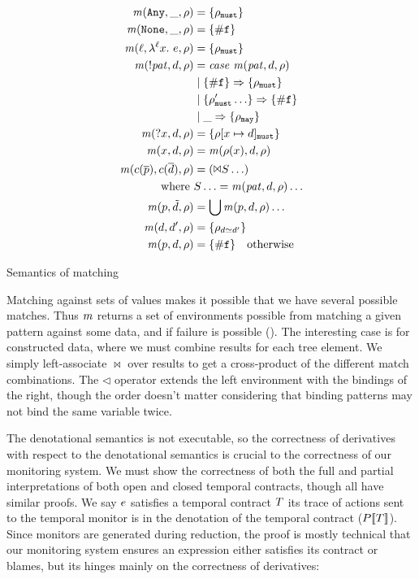   {\begin{align*}
    \matches(\sany, \_, \menv) &= \setof{\menv_\must} \\
    \matches(\snone, \_, \menv) &= \setof{\nomatch} \\
    \matches(\mtoplevelname, \snlam{\mtoplevelname}{\mvar}{\mexp}, \menv) &= \setof{\menv_\must} \\
    \matches(\snegpat{\mvpat}, \mdata, \menv) &= \mathit{case}\ \matches(\mvpat, \mdata, \menv)\\
      &\alt \setof{\nomatch} \Rightarrow \setof{\menv_\must} \\
      &\alt \setof{\menv'_\must\ldots} \Rightarrow \setof{\nomatch} \\
      &\alt \_ \Rightarrow \setof{\menv_\may} \\
    \matches(\sbind{\mvar}, \mdata, \menv) &= \setof{\menv[\mvar \mapsto \mdata]_\must} \\
    \matches(\mvar, \mdata, \menv) &= \matches(\menv(\mvar), \mdata, \menv) \\
    \matches(\mconstructor(\many{\mpat}), \mconstructor(\many{\mdata}), \menv) &= (\Bowtie S \ldots) \\
    \text{where }& S \ldots = \matches(\mvpat, \mdata, \menv) \ldots \\
    \matches(\mpat, \isset{\mdata}, \menv) &= \bigcup \matches(\mpat,\mdata,\menv)\ldots \\
    \matches(\mdata, \mdata', \menv) &= \setof{\menv_{\mdata \simeq \mdata'}} \\
    \matches(\mpat, \mdata, \menv) &= \setof{\nomatch} \quad
    \text{otherwise}
  \end{align*}}{\caption{Semantics of matching}\label{fig:matchsem}}

Matching against sets of values makes it possible that we have several possible matches.
%
Thus $\mathit{m}$ returns a set of environments possible from matching a given pattern against some data, and if failure is possible (\nomatch).
%
The interesting case is for constructed data, where we must combine results for each tree element.
%
We simply left-associate $\bowtie$ over results to get a cross-product of the different match combinations.
%
The $\triangleleft$ operator extends the left environment with the bindings of the right, though the order doesn't matter considering that binding patterns may not bind the same variable twice.
%

The denotational semantics is not executable, so the correctness of derivatives with respect to the denotational semantics is crucial to the correctness of our monitoring system.
%
We must show the correctness of both the full and partial interpretations of both open and closed temporal contracts, though all have similar proofs.
%
We say $e$ satisfies a temporal contract $T$ its trace of actions sent to the temporal monitor is in the denotation of the temporal contract ($P[\![ T ]\!]$).
%
Since monitors are generated during reduction, the proof is mostly technical that our monitoring system ensures an expression either satisfies its contract or blames, but its hinges mainly on the correctness of derivatives:
%

